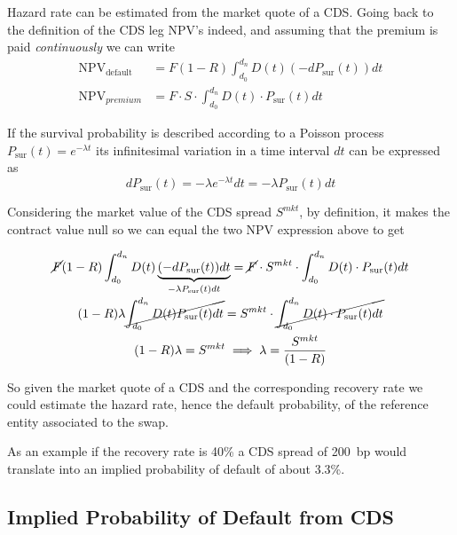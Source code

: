 Hazard rate can be estimated from the market quote of a CDS. Going back to the definition of the CDS leg NPV's indeed, and assuming that the premium is paid \emph{continuously} we can write
\begin{equation}
  \begin{aligned}
    \mathrm{NPV_{default}} &= F(1-R) \int_{d_0}^{d_n} D(t) (-dP_{\textrm{sur}}(t)) dt \\
    \textrm{NPV}_{premium} &= F\cdot S \cdot \int_{d_0}^{d_n} D(t) \cdot P_{\textrm{sur}}(t) dt 
  \end{aligned}
\end{equation}

If the survival probability is described according to a Poisson process $P_{\textrm{sur}}(t) = e^{−\lambda t}$ its infinitesimal variation in a time interval $dt$ can be expressed as
\begin{equation*}
  dP_{\textrm{sur}}(t) = -\lambda e^{−\lambda t} dt = -\lambda P_{\textrm{sur}}(t) dt 
\end{equation*}

Considering the market value of the CDS spread $S^{mkt}$, by definition, it makes the contract value null so we can equal the two NPV expression above to get

\begin{equation*}
  \begin{gathered}
    \cancel{F}(1-R) \int_{d_0}^{d_n} D(t) \underbrace{(-dP_{\textrm{sur}}(t)) dt}_{-\lambda  P_{\textrm{sur}}(t) dt} =  \cancel{F}\cdot S^{mkt} \cdot \int_{d_0}^{d_n} D(t) \cdot P_{\textrm{sur}}(t) dt \\
    (1-R) \lambda \cancel{\int_{d_0}^{d_n} D(t) P_{\textrm{sur}}(t) dt} =  S^{mkt} \cdot \cancel{\int_{d_0}^{d_n} D(t) \cdot P_{\textrm{sur}}(t) dt} \\
    (1-R) \lambda = S^{mkt} \implies  \lambda = \frac{ S^{mkt}}{(1-R)}
  \end{gathered}
\end{equation*}

So given the market quote of a CDS and the corresponding recovery rate we could estimate the hazard rate, hence the default probability, of the reference entity associated to the swap.

As an example if the recovery rate is 40\% a CDS spread of 200~bp would translate into an implied probability of default of about 3.3\%.

\subsection{Implied Probability of Default from CDS}
\label{default-probabilities-and-cds}


